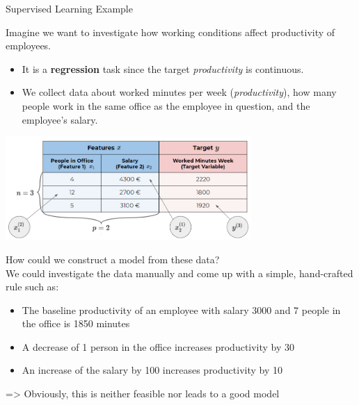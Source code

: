 \begin{vbframe}{Supervised Learning Example}

Imagine we want to investigate how working conditions affect productivity of employees.

\begin{itemize}
	\item It is a \textbf{regression} task since the target \emph{productivity} is continuous.
	\item We collect data about worked minutes 
per week (\emph{productivity}), how many people work in the same office as the 
employee in question, and the employee's salary.
\end{itemize}
  
\begin{center}
  \includegraphics[width = 0.7\textwidth]{figure_man/data_table} 
\end{center}

\framebreak

How could we construct a model from these data?\\[1ex]

We could investigate the data manually and come up with a simple, hand-crafted rule such as:
	
	\begin{itemize}
		\item The baseline productivity of an employee with salary 3000 and 7 people in the office is 1850 minutes
		\item A decrease of 1 person in the office increases productivity by 30 
		\item An increase of the salary by 100 increases productivity by 10
	\end{itemize}

=> Obviously, this is neither feasible nor leads to a good model
\end{vbframe}


